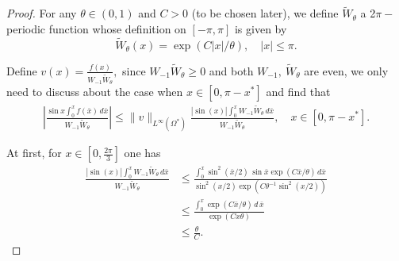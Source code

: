 \documentclass[12pt]{amsart}
\numberwithin{equation}{section}
\numberwithin{equation}{section}
\begin{document}
 \begin{proof}
For any $\theta \in(0, 1)$ and  $C>0$ (to be chosen later),   we define  $\widetilde{W}_\theta$ a 2$\pi-$periodic function whose definition on  $[-\pi, \pi]$ is given  by
 \begin{equation}
 \widetilde{W}_\theta (x) =
 \exp(C|x|/{\theta}),\quad |x|\leq \pi. 
 \end{equation}
    

 Define $v(x)=\frac{f(x)}{W_{-1}\widetilde{W}_{\theta}},$ since $W_{-1} \widetilde{W}_\theta \geq 0$  and both $W_{-1},~\widetilde{W}_\theta$ are even, we only need to discuss about the case when $x\in[0, \pi-x^*]$  and find that 
   \begin{align*}
\left|\frac{\sin x \int_0^x f(\bar x)\,d\bar x}{W_{-1}\widetilde W_\theta}\right|  \leq \|v\|_{L^\infty(\Omega^*)} \frac{ |\sin (x)| \int_0^x W_{-1} \widetilde{W}_\theta \,d\bar x}{W_{-1} \widetilde{W}_\theta}, \quad x\in [0, \pi-x^*].
\end{align*}
 
  
  At first, for $x\in[0,  \frac{2\pi}{3}]$ one has 
 \begin{align*}
\frac{ |\sin (x)| \int_0^x W_{-1} \widetilde{W}_\theta \,d\bar x}{W_{-1} \widetilde{W}_\theta}&\leq  \frac{ \int_0^x \sin^2(\bar x/2)\,\sin \bar x \exp(C\bar x/\theta)  \,d\bar x}{ \sin^2({x/2})\exp(C\theta^{-1} \sin^2(x/2))}  \\
  &\leq  \frac{  \int_0^{x} \exp(C \bar x/\theta)  \,d \,\bar x}{ \exp(Cx\theta)}  \\
&\leq \frac{\theta}{C}.
 \end{align*}
   

\end{proof}
\end{document}
